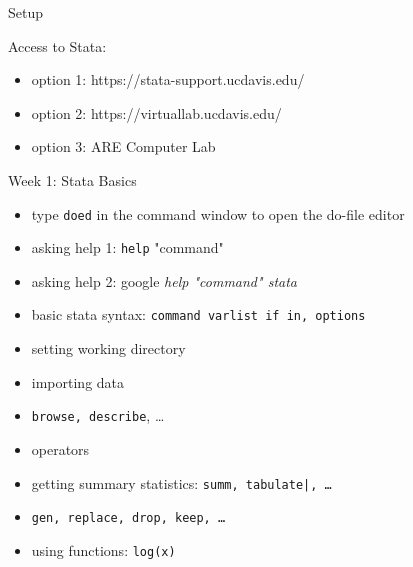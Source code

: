 \documentclass{beamer}
\begin{document}
\begin{frame}{Setup}

Access to Stata:
\begin{itemize}
\item option 1: https://stata-support.ucdavis.edu/
\item option 2: https://virtuallab.ucdavis.edu/
\item option 3: ARE Computer Lab
\end{itemize}
\end{frame}

\begin{frame}{Week 1: Stata Basics}

\begin{itemize}
\item type \texttt{doed} in the command window to open the do-file editor
\item asking help 1: \texttt{help} "command"
\item asking help 2: google \emph{help "command" stata}
\item basic stata syntax: \texttt{command varlist if in, options}
\end{itemize}
        
\begin{itemize}
\item setting working directory
\item importing data
\item \texttt{browse, describe}, \dots
\item operators
\item getting summary statistics: \texttt{summ, tabulate|, \dots}
\item \texttt{gen, replace, drop, keep, \dots}
\item using functions: \texttt{log(x)}
\end{itemize}

\end{frame}
\end{document}
